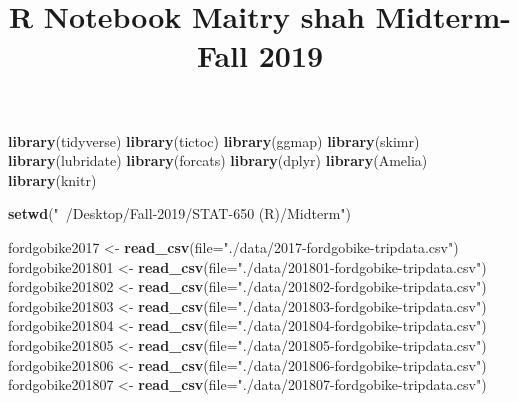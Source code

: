 \documentclass[]{article}
\title{R Notebook Maitry shah Midterm- Fall 2019}
\author{}
\date{}
\newenvironment{Shaded}{\begin{snugshade}}{\end{snugshade}}
\newcommand{\DataTypeTok}[1]{\textcolor[rgb]{0.13,0.29,0.53}{#1}}
\newcommand{\KeywordTok}[1]{\textcolor[rgb]{0.13,0.29,0.53}{\textbf{#1}}}
\newcommand{\NormalTok}[1]{#1}
\newcommand{\StringTok}[1]{\textcolor[rgb]{0.31,0.60,0.02}{#1}}
\begin{document}
\maketitle

\begin{Shaded}
\begin{Highlighting}[]
\KeywordTok{library}\NormalTok{(tidyverse)}
\KeywordTok{library}\NormalTok{(tictoc)}
\KeywordTok{library}\NormalTok{(ggmap)}
\KeywordTok{library}\NormalTok{(skimr)}
\KeywordTok{library}\NormalTok{(lubridate)}
\KeywordTok{library}\NormalTok{(forcats)}
\KeywordTok{library}\NormalTok{(dplyr)}
\KeywordTok{library}\NormalTok{(Amelia)}
\KeywordTok{library}\NormalTok{(knitr)}
\end{Highlighting}
\end{Shaded}

\begin{Shaded}
\begin{Highlighting}[]
\KeywordTok{setwd}\NormalTok{(}\StringTok{"~/Desktop/Fall-2019/STAT-650 (R)/Midterm"}\NormalTok{)}
\end{Highlighting}
\end{Shaded}

\begin{Shaded}
\begin{Highlighting}[]
\NormalTok{fordgobike2017 <-}\StringTok{ }\KeywordTok{read_csv}\NormalTok{(}\DataTypeTok{file=}\StringTok{"./data/2017-fordgobike-tripdata.csv"}\NormalTok{)}
\NormalTok{fordgobike201801 <-}\StringTok{ }\KeywordTok{read_csv}\NormalTok{(}\DataTypeTok{file=}\StringTok{"./data/201801-fordgobike-tripdata.csv"}\NormalTok{)}
\NormalTok{fordgobike201802 <-}\StringTok{ }\KeywordTok{read_csv}\NormalTok{(}\DataTypeTok{file=}\StringTok{"./data/201802-fordgobike-tripdata.csv"}\NormalTok{)}
\NormalTok{fordgobike201803 <-}\StringTok{ }\KeywordTok{read_csv}\NormalTok{(}\DataTypeTok{file=}\StringTok{"./data/201803-fordgobike-tripdata.csv"}\NormalTok{)}
\NormalTok{fordgobike201804 <-}\StringTok{ }\KeywordTok{read_csv}\NormalTok{(}\DataTypeTok{file=}\StringTok{"./data/201804-fordgobike-tripdata.csv"}\NormalTok{)}
\NormalTok{fordgobike201805 <-}\StringTok{ }\KeywordTok{read_csv}\NormalTok{(}\DataTypeTok{file=}\StringTok{"./data/201805-fordgobike-tripdata.csv"}\NormalTok{)}
\NormalTok{fordgobike201806 <-}\StringTok{ }\KeywordTok{read_csv}\NormalTok{(}\DataTypeTok{file=}\StringTok{"./data/201806-fordgobike-tripdata.csv"}\NormalTok{)}
\NormalTok{fordgobike201807 <-}\StringTok{ }\KeywordTok{read_csv}\NormalTok{(}\DataTypeTok{file=}\StringTok{"./data/201807-fordgobike-tripdata.csv"}\NormalTok{)}
\end{Highlighting}
\end{Shaded}
\end{document}
